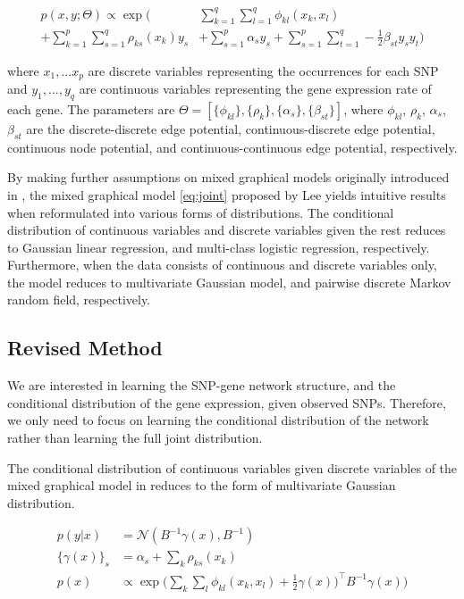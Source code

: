 \documentclass{article}
\begin{document}
\begin{align}
p(x, y ; \Theta) \propto \exp \Big( &\sum_{k=1}^{q} \sum_{l=1}^{q} \phi_{kl} (x_k, x_l) \nonumber \\
+ \sum_{k=1}^{p} \sum_{s=1}^{q} \rho_{ks}(x_k) y_s  &+ \sum_{s=1}^{p} \alpha_s y_s + \sum_{s=1}^{p} \sum_{t=1}^{q} -\frac{1}{2} \beta_{st} y_s y_t \Big) \label{eq:joint}
\end{align} 

where $x_1, ... x_p$ are discrete variables representing the occurrences for each SNP and $y_1, ..., y_q$ are continuous variables representing the gene expression rate of each gene. 
The parameters are $\Theta = [\{\phi_{kl}\}, \{\rho_{k}\}, \{\alpha_{s}\}, \{\beta_{st}\}]$, where $\phi_{kl}$, $\rho_{k}$, $\alpha_{s}$, $\beta_{st}$ are the discrete-discrete edge potential, continuous-discrete edge potential, continuous node potential, and continuous-continuous edge potential, respectively.

By making further assumptions on mixed graphical models originally introduced in \cite{lauritzen1989graphical}, the mixed graphical model \ref{eq:joint} proposed by Lee \cite{lee2013structure} yields intuitive results when reformulated into various forms of distributions. The conditional distribution of continuous variables and discrete variables given the rest reduces to Gaussian linear regression, and multi-class logistic regression, respectively. Furthermore, when the data consists of continuous and discrete variables only, the model reduces to multivariate Gaussian model, and pairwise discrete Markov random field, respectively. 

\subsection{Revised Method}
We are interested in learning the SNP-gene network structure, and the conditional distribution of the gene expression, given observed SNPs.
Therefore, we only need to focus on learning the conditional distribution of the network rather than learning the full joint distribution. 

The conditional distribution of continuous variables given discrete variables of the mixed graphical model in \cite{lee2013structure} reduces to the form of multivariate Gaussian distribution.

\begin{align}
p(y|x) &= \mathcal{N}(B^{-1}\gamma(x), B^{-1}) \label{eq:cond_prob}\\
\{\gamma(x)\}_s &= \alpha_s + \sum_{k} \rho_{ks}(x_k) \\
p(x) &\propto \exp \Big( \sum_{k} \sum_{l} \phi_{kl}(x_k, x_l) + \frac{1}{2} \gamma(x))^\intercal B^{-1} \gamma(x) \Big)
\end{align}
\end{document}
